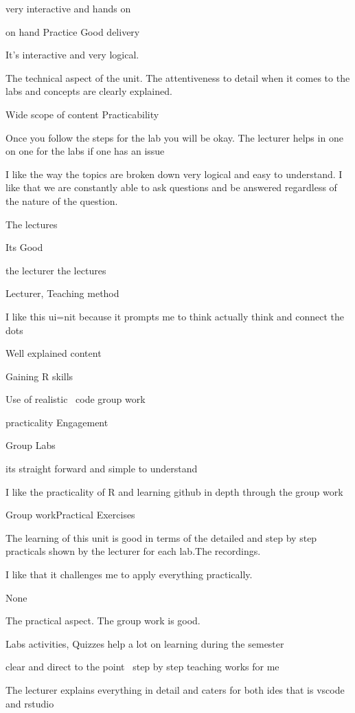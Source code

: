 \documentclass[
]{article}
\begin{document}
\begin{enumerate}
\begin{itemize}
    very interactive and hands on

    on hand Practice Good delivery

    It's interactive and very logical.

    The technical aspect of the unit. The attentiveness to detail when
    it comes to the labs and concepts are clearly explained.

    Wide scope of content Practicability

    Once you follow the steps for the lab you will be okay. The lecturer
    helps in one on one for the labs if one has an issue

    I like the way the topics are broken down very logical and easy to
    understand. I like that we are constantly able to ask questions and
    be answered regardless of the nature of the question.

    The lectures

    Its Good

    the lecturer the lectures

    Lecturer, Teaching method

    I like this ui=nit because it prompts me to think actually think and
    connect the dots~

    Well explained content

    Gaining R skills

    Use of realistic~ code group work

    practicality Engagement

    Group Labs

    its straight forward and simple to understand~

    I like the practicality of R and learning github in depth through
    the group work

    Group workPractical Exercises

    The learning of this unit is good in terms of the detailed and step
    by step practicals shown by the lecturer for each lab.The
    recordings.

    I like that it challenges me to apply everything practically.

    None

    The practical aspect. The group work is good.

    Labs activities, Quizzes help a lot on learning during the semester

    clear and direct to the point~ step by step teaching works for me

    The lecturer explains everything in detail and caters for both ides
    that is vscode and rstudio


\end{itemize}
\end{enumerate}
\end{document}
